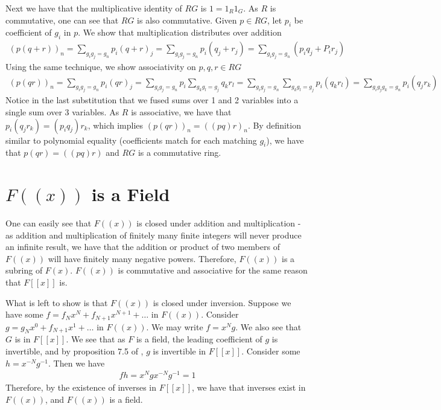 \documentclass[12pt]{article}
\newcommand*{\inv}{^{-1}}
\begin{document}
Next we have that the multiplicative identity of $RG$ is $1 = 1_R1_G$. As $R$ is commutative, one can see that $RG$ is also commutative. Given $ p \in RG$, let $p_i$ be coefficient of $g_i$ in $p$. We show that multiplication distributes over addition
\begin{align*}
(p(q + r))_n = \sum_{g_i g_j = g_n} p_i (q + r)_j = \sum_{g_i g_j = g_n} p_i (q_j + r_j) =  \sum_{g_i g_j = g_n} \left(p_i q_j + P_i r_j\right)
\end{align*}
Using the same technique, we show associativity on $p, q, r \in RG$
\begin{align*}
(p(qr))_n = \sum_{g_i g_j = g_n} p_i (qr)_j = \sum_{g_i g_j = g_n} p_i \sum_{g_k g_l = g_j} q_k r_l = \sum_{g_i g_j = g_n} \sum_{g_k g_l = g_j} p_i (q_k r_l) = \sum_{g_i g_j g_k = g_n}  p_i (q_j r_k)
\end{align*}
Notice in the last substitution that we fused sums over 1 and 2 variables into a single sum over 3 variables. As $R$ is associative, we have that $p_i(q_j r_k) = (p_i q_j)r_k$, which implies $(p(qr))_n = ((pq)r)_n$. By definition similar to polynomial equality (coefficients match for each matching $g_i$), we have that $p(qr) = ((pq)r)$ and $RG$ is a commutative ring.


\section{$F((x))$ is a Field}
One can easily see that $F((x))$ is closed under addition and multiplication - as addition and multiplication of finitely many finite integers will never produce an infinite result, we have that the addition or product of two members of $F((x))$ will have finitely many negative powers. Therefore, $F((x))$ is a subring of $F(x)$. $F((x))$ is commutative and associative for the same reason that $F[[x]]$ is.

What is left to show is that $F((x))$ is closed under inversion. Suppose we have some $f = f_Nx^N + f_{N+1}x^{N+1} + \ldots$ in $F((x))$. Consider $g = g_Nx^0 + f_{N+1}x^1 + \ldots$ in $F((x))$. We may write $f = x^Ng$. We also see that $G$ is in $F[[x]]$. We see that as $F$ is a field, the leading coefficient of $g$ is invertible, and by proposition 7.5 of \cite{wagner}, $g$ is invertible in $F[[x]]$. Consider some $h = x^{-N}g\inv$. Then we have 
\begin{align*}
fh = x^N g x^{-N} g\inv = 1
\end{align*}
Therefore, by the existence of inverses in $F[[x]]$, we have that inverses exist in $F((x))$, and $F((x))$ is a field.
\end{document}
